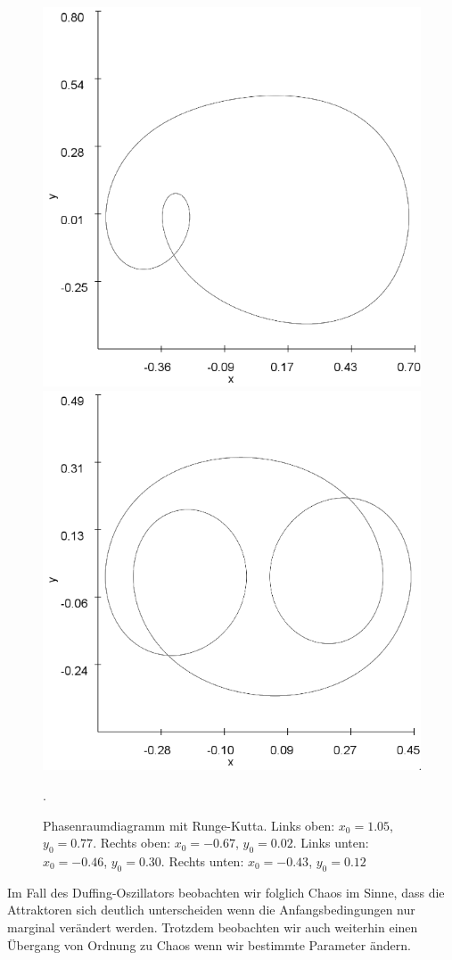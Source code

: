 \documentclass{scrartcl}
\begin{document}
\begin{figure}[!htbp]
\includegraphics[scale=0.4]{duffing-awp4-500k-nach-500k-h0,01-runge}
\includegraphics[scale=0.4]{duffing-awp5-500k-nach-500k-h0,01-runge}
\caption{Phasenraumdiagramm mit Runge-Kutta. Links oben: $x_0=1.05$, $y_0=0.77$. Rechts oben: $x_0=-0.67$, $y_0=0.02$. Links unten: $x_0=-0.46$, $y_0=0.30$. Rechts unten: $x_0=-0.43$, $y_0=0.12$}. 
\label{fig:duffing-allawp}
\end{figure}
Im Fall des Duffing-Oszillators beobachten wir folglich Chaos im Sinne, dass die Attraktoren sich deutlich unterscheiden wenn die Anfangsbedingungen nur marginal verändert werden. Trotzdem beobachten wir auch weiterhin einen Übergang von Ordnung zu Chaos wenn wir bestimmte Parameter ändern. 
\end{document}
